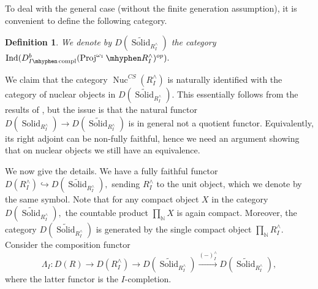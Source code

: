 \documentclass[11pt,leqno]{amsart}
\newtheorem{defi}[theo]{Definition}
\numberwithin{equation}{section}
\def\N{\mathbb{N}}
\def\Z{\mathbb{Z}}
\def\wt{\widetilde}
\newcommand{\hy}{\mhyphen}
\newcommand{\prodd}[1][]{\mathop{\prod}\limits_{#1}}
\newcommand{\xto}{\xrightarrow}
\newcommand{\hto}{\hookrightarrow}
\newcommand{\Nuc}{\operatorname{Nuc}}
\newcommand{\Solid}{\operatorname{Solid}}
\newcommand{\Proj}{\operatorname{Proj}}
\newcommand{\Ind}{\operatorname{Ind}}
\newcommand{\tors}{\operatorname{tors}}
\newcommand{\compl}{\operatorname{compl}}
\begin{document}
To deal with the general case (without the finite generation assumption), it is convenient to define the following category.






\begin{defi}
We denote by $D(\wt{\Solid}_{R^{\wedge}_I})$ the category $\Ind(D^b_{I\hy\compl}(\Proj^{\omega_1}\hy R^{\wedge}_I)^{op}).$
\end{defi}

We claim that the category $\Nuc^{CS}(R^{\wedge}_I)$ is naturally identified with the category of nuclear objects in $D(\wt{\Solid}_{R^{\wedge}_I}).$ This essentially follows from the results of \cite{And23}, but the issue is that the natural functor $D(\Solid_{R^{\wedge}_I})\to D(\wt{\Solid}_{R^{\wedge}_I})$ is in general not a quotient functor. Equivalently, its right adjoint can be non-fully faithful, hence we need an argument showing that on nuclear objects we still have an equivalence.

We now give the details. We have a fully faithful functor $D(R^{\wedge}_I)\hto D(\wt{\Solid}_{R^{\wedge}_I}),$ sending $R^{\wedge}_I$ to the unit object, which we denote by the same symbol. Note that for any compact object $X$ in the category $D(\wt{\Solid}_{R^{\wedge}_I}),$ the countable product $\prodd[\N]X$ is again compact. Moreover, the category $D(\wt{\Solid}_{R^{\wedge}_I})$ is generated by the single compact object $\prodd[\N]R^{\wedge}_I.$ Consider the composition functor
\begin{equation*}
	\Lambda_I:D(R)\to D(R^{\wedge}_I)\to D(\wt{\Solid}_{R^{\wedge}_I})\xto{(-)^{\wedge}_I}  D(\wt{\Solid}_{R^{\wedge}_I}),
\end{equation*}  
where the latter functor is the $I$-completion.
\end{document}
